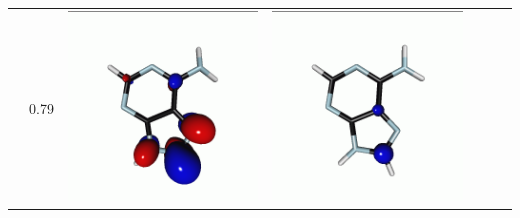 \documentclass[journal=jctcce,manuscript=article]{achemso}
\begin{document}
\begin{table}[H]
\begin{tabular}{ l| c c c | c c c }
\begin{minipage}{0.2\textwidth}
    \end{minipage}
    & 0.79
    &  \begin{minipage}{0.2\textwidth}
        \centering
        \includegraphics[scale=0.10]{NTO/Adenine_C/2p_C1.png}
    \end{minipage}
    & 
    \begin{minipage}{0.2\textwidth}
        \centering
        \includegraphics[scale=0.10]{NTO/Adenine_C/2h_Cs.png}

\end{minipage}
\end{tabular}
\end{table}
\end{document}
